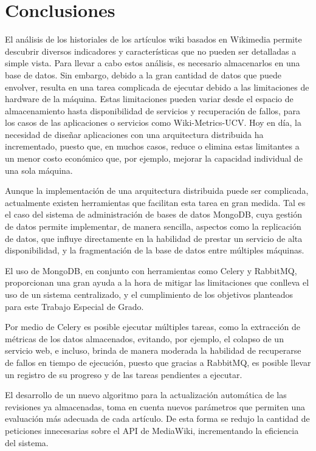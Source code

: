 \section{Conclusiones}

El análisis de los historiales de los artículos wiki basados en Wikimedia permite
descubrir diversos indicadores y características que no pueden ser detalladas a simple
vista.
Para llevar a cabo estos análisis, es necesario almacenarlos en una base
de datos. Sin embargo, debido a la gran cantidad de datos que puede envolver, resulta
en una tarea complicada de ejecutar debido a las limitaciones de hardware de la
máquina.
Estas limitaciones pueden variar desde el espacio de almacenamiento hasta disponibilidad
de servicios y recuperación de fallos, para los casos de las aplicaciones o servicios como
Wiki-Metrics-UCV.
Hoy en día, la necesidad de diseñar aplicaciones con una arquitectura distribuida
ha incrementado, puesto que, en muchos casos, reduce o elimina estas limitantes
a un menor costo económico que, por ejemplo, mejorar la capacidad individual de una sola máquina.

Aunque la implementación de una arquitectura distribuida puede ser complicada,
actualmente existen herramientas que facilitan esta tarea en gran medida.
Tal es el caso del sistema de administración de bases de datos MongoDB, cuya gestión
de datos permite implementar, de manera sencilla, aspectos como la replicación de datos, 
que influye directamente en la habilidad de prestar un servicio de alta disponibilidad,
y la fragmentación de la base de datos entre múltiples máquinas.

El uso de MongoDB, en conjunto con herramientas como Celery y RabbitMQ, proporcionan
una gran ayuda a la hora de mitigar las limitaciones que conlleva el uso de un sistema centralizado, y el cumplimiento de los objetivos planteados para este Trabajo Especial de Grado.

Por medio de Celery es posible ejecutar múltiples tareas, como la extracción de métricas de los
datos almacenados, evitando, por ejemplo, el colapso de un servicio web, e incluso, brinda
de manera moderada la habilidad de recuperarse de fallos en tiempo de ejecución, puesto que gracias a RabbitMQ,
es posible llevar un registro de su progreso y de las tareas pendientes a ejecutar.

El desarrollo de un nuevo algoritmo para la actualización automática de las revisiones ya almacenadas, toma en cuenta nuevos parámetros que permiten una evaluación más adecuada de cada artículo.
De esta forma se redujo la cantidad de peticiones innecesarias sobre el API de MediaWiki, incrementando la eficiencia del sistema.

